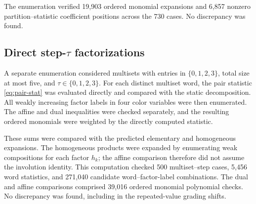 \documentclass[11pt,reqno]{amsart}
\theoremstyle{definition}
\theoremstyle{remark}
\numberwithin{equation}{section}
\begin{document}
The enumeration verified 19,903 ordered monomial expansions and 6,857
nonzero partition--statistic coefficient positions across the 730 cases.
No discrepancy was found.

\subsection{Direct \texorpdfstring{step-$\tau$}{step-tau} factorizations}
A separate enumeration considered multisets with entries in
$\{0,1,2,3\}$, total size at most five, and
$\tau\in\{0,1,2,3\}$.  For each distinct multiset word, the pair statistic
\eqref{eq:pair-stat} was evaluated directly and compared with the static
decomposition.  All weakly increasing factor labels in four color
variables were then enumerated.  The affine and dual inequalities were
checked separately, and the resulting ordered monomials were weighted
by the directly computed statistic.

These sums were compared with the predicted elementary and homogeneous
expansions.  The homogeneous products were expanded by enumerating weak
compositions for each factor $h_k$; the affine comparison therefore did
not assume the involution identity.  This computation checked 500
multiset--step cases, 5,456 word statistics, and 271,040 candidate
word--factor-label combinations.  The dual and affine comparisons
comprised 39,016 ordered monomial polynomial checks.  No discrepancy was
found, including in the repeated-value grading shifts.
\end{document}
